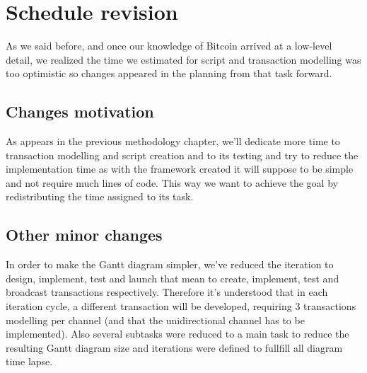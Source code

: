 \chapter*{Schedule revision}
\label{chap:schedule-revision}
As we said before, and once our knowledge of Bitcoin arrived at a low-level detail, we realized the time we estimated for script and transaction modelling was too optimistic so changes appeared in the planning from that task forward.
\section{Changes motivation}
As appears in the previous methodology chapter, we'll dedicate more time to transaction modelling and script creation and to its testing and try to reduce the implementation time as with the framework created it will suppose to be simple and not require much lines of code. This way we want to achieve the goal by redistributing the time assigned to its task.
\section{Other minor changes}
In order to make the Gantt diagram simpler, we've reduced the iteration to design, implement, test and launch that mean to create, implement, test and broadcast transactions respectively. Therefore it's understood that in each iteration cycle, a different transaction will be developed, requiring 3 transactions modelling per channel (and that the unidirectional channel has to be implemented). Also several subtasks were reduced to a main task to reduce the resulting Gantt diagram size and iterations were defined to fullfill all diagram time lapse.
\clearpage

